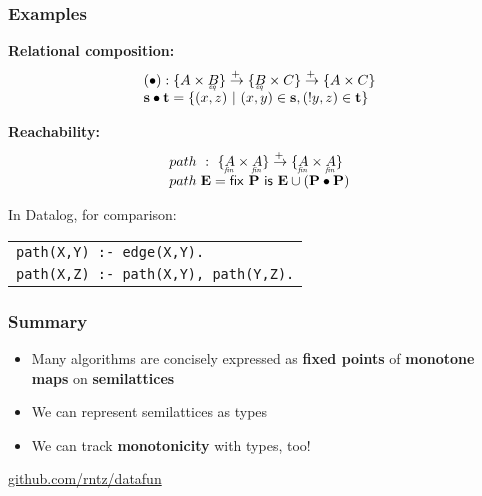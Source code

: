 \documentclass{beamer}
\newcommand{\mto}{\overset{+\:}{\to}}
\newcommand{\eq}[1]{\underaccent{\mathit{eq}}{#1}}
\newcommand{\fin}[1]{\underaccent{\mathit{fin}}{#1}}
\newcommand{\m}[1]{\ensuremath{\mathbf{#1}}}
\newcommand{\ms}{\mathsf}
\begin{document}

\begin{frame}
  \frametitle{Examples}

  \textbf{Relational composition:}\vspace{-0.8em}
  \[\begin{array}{l}
    (\bullet) : \{A \times \eq{B}\} \mto \{\eq{B} \times C\} \mto \{A \times C\}\\
    \m{s} \bullet \m{t} =
    \{(x,z) ~|~ (x,y) \in \m{s}, (!y,z) \in \m{t}\}
  \end{array}\]

  \vspace{0.2em}

  \textbf{Reachability:}\vspace{-0.8em}
  \[\begin{array}{l}
    path ~:~ \{\fin{A} \times \fin{A}\} \mto \{\fin{A} \times \fin{A}\}\\
    path\;\m{E} = \ms{fix}~\m{P}~\ms{is}~ \m{E} \cup (\m{P} \bullet \m{P})
  \end{array}\]
  \vspace{0.2em}

  In Datalog, for comparison:
  \begin{tabular}{l}
    \texttt{path(X,Y) :- edge(X,Y).}\\
    \texttt{path(X,Z) :- path(X,Y), path(Y,Z).}\\
  \end{tabular}

\end{frame}


\begin{frame}
  \frametitle{Summary}

  \begin{itemize}
  \item Many algorithms are concisely expressed as \textbf{fixed points} of
    \textbf{monotone maps} on \textbf{semilattices}
  \item We can represent semilattices as types
  \item We can track \textbf{monotonicity} with types, too!
  \end{itemize}

  \vspace{1em}
  \begin{center}
    {\Large \url{github.com/rntz/datafun}}
  \end{center}
\end{frame}
\end{document}
